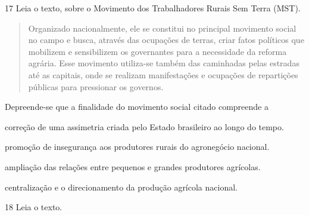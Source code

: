 \num{17} Leia o texto, sobre o Movimento dos Trabalhadores Rurais Sem Terra (MST).

\begin{quote}
Organizado nacionalmente, ele se constitui no principal
movimento social no campo e busca, através das ocupações de terras,
criar fatos políticos que mobilizem e sensibilizem os governantes para a
necessidade da reforma agrária. Esse movimento utiliza-se também das
caminhadas pelas estradas até as capitais, onde se realizam
manifestações e ocupações de repartições públicas para pressionar os
governos.

\end{quote}

Depreende-se que a finalidade do movimento social citado compreende a

\begin{escolha}
\item  correção de uma assimetria criada pelo Estado brasileiro ao longo do tempo.

\item  promoção de insegurança aos produtores rurais do agronegócio nacional.

\item  ampliação das relações entre pequenos e grandes produtores agrícolas.

\item  centralização e o direcionamento da produção agrícola nacional.
\end{escolha}

\pagebreak
\num{18} Leia o texto.

